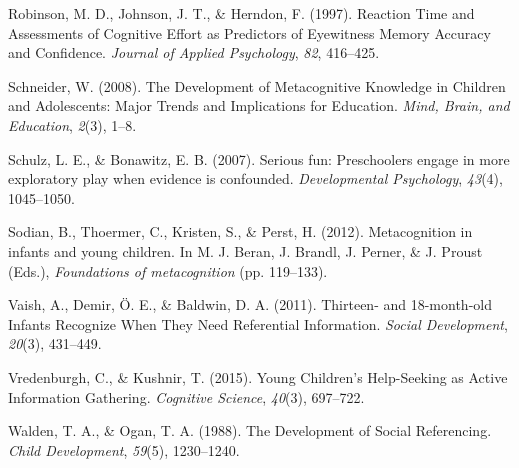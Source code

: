 \documentclass[10pt, letterpaper]{article}
\begin{document}
\hypertarget{ref-Robinson1997}{}
Robinson, M. D., Johnson, J. T., \& Herndon, F. (1997). Reaction Time
and Assessments of Cognitive Effort as Predictors of Eyewitness Memory
Accuracy and Confidence. \emph{Journal of Applied Psychology},
\emph{82}, 416--425.

\hypertarget{ref-Schneider2008}{}
Schneider, W. (2008). The Development of Metacognitive Knowledge in
Children and Adolescents: Major Trends and Implications for Education.
\emph{Mind, Brain, and Education}, \emph{2}(3), 1--8.

\hypertarget{ref-Schulz2007}{}
Schulz, L. E., \& Bonawitz, E. B. (2007). Serious fun: Preschoolers
engage in more exploratory play when evidence is confounded.
\emph{Developmental Psychology}, \emph{43}(4), 1045--1050.

\hypertarget{ref-Sodian2012}{}
Sodian, B., Thoermer, C., Kristen, S., \& Perst, H. (2012).
Metacognition in infants and young children. In M. J. Beran, J. Brandl,
J. Perner, \& J. Proust (Eds.), \emph{Foundations of metacognition} (pp.
119--133).

\hypertarget{ref-Vaish2011}{}
Vaish, A., Demir, Ö. E., \& Baldwin, D. A. (2011). Thirteen- and
18-month-old Infants Recognize When They Need Referential Information.
\emph{Social Development}, \emph{20}(3), 431--449.

\hypertarget{ref-Vredenburgh2015}{}
Vredenburgh, C., \& Kushnir, T. (2015). Young Children's Help-Seeking as
Active Information Gathering. \emph{Cognitive Science}, \emph{40}(3),
697--722.

\hypertarget{ref-Walden1988}{}
Walden, T. A., \& Ogan, T. A. (1988). The Development of Social
Referencing. \emph{Child Development}, \emph{59}(5), 1230--1240.
\end{document}
